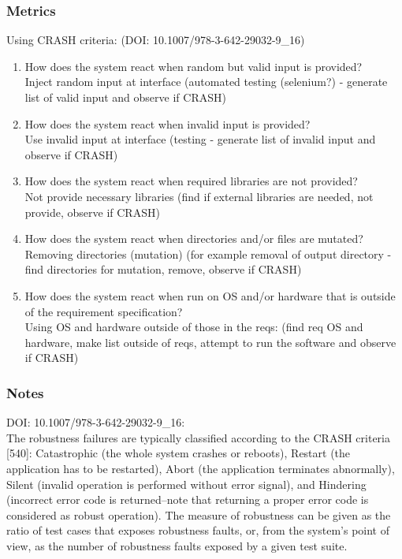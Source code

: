 \documentclass{article}
\begin{document}
\subsubsection{Metrics}
Using CRASH criteria: (DOI: 10.1007/978-3-642-29032-9\_16)
\begin{enumerate}
	\item How does the system react when random but valid input is provided?\\
	
	Inject random input at interface (automated testing (selenium?) - generate list of valid input and observe if CRASH)
	\item How does the system react when invalid input is provided?\\
	
	Use invalid input at interface (testing - generate list of invalid input and observe if CRASH)
	\item How does the system react when required libraries are not provided?\\
	
	Not provide necessary libraries (find if external libraries are needed, not provide, observe if CRASH)
	\item How does the system react when directories and/or files are mutated?\\
	
	Removing directories (mutation) (for example removal of output directory - find directories for mutation, remove, observe if CRASH)
	
	\item How does the system react when run on OS and/or hardware that is outside of the requirement specification?\\
	
	Using OS and hardware outside of those in the reqs: (find req OS and hardware, make list outside of reqs, attempt to run the software and observe if CRASH)
\end{enumerate}
\subsubsection{Notes}
DOI: 10.1007/978-3-642-29032-9\_16:\\ 
The robustness failures are typically classified according to the CRASH criteria [540]: Catastrophic (the whole system crashes or reboots), Restart (the application has to be restarted), Abort (the application terminates abnormally), Silent (invalid operation is performed without error signal), and Hindering (incorrect error code is returned–note that returning a proper error code is considered as robust operation). The measure of robustness can be given as the ratio of test cases that exposes robustness faults, or, from the system’s point of view, as the number of robustness faults exposed by a given test suite.\\ 
\end{document}
